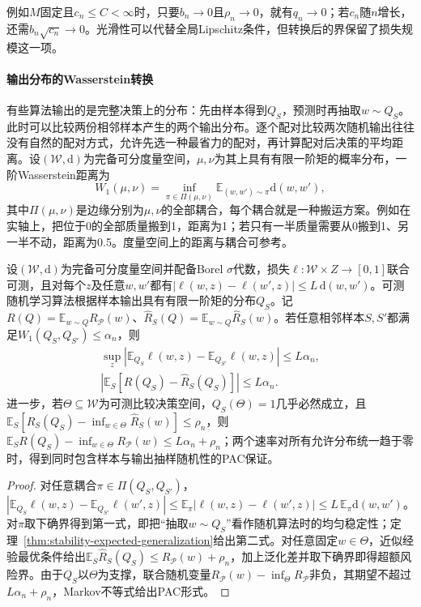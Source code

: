 例如$M$固定且$c_n\leq C<\infty$时，只要$b_n\to0$且$\rho_n\to0$，就有$q_n\to0$；若$c_n$随$n$增长，还需$b_n\sqrt{c_n}\to0$。光滑性可以代替全局Lipschitz条件，但转换后的界保留了损失规模这一项。

\paragraph{输出分布的Wasserstein转换}

有些算法输出的是完整决策上的分布：先由样本得到$Q_S$，预测时再抽取$w\sim Q_S$。此时可以比较两份相邻样本产生的两个输出分布。逐个配对比较两次随机输出往往没有自然的配对方式，允许先选一种最省力的配对，再计算配对后决策的平均距离。设$(\mathcal W,\mathrm d)$为完备可分度量空间，$\mu,\nu$为其上具有有限一阶矩的概率分布，一阶Wasserstein距离为
\[
 W_1(\mu,\nu)=\inf_{\pi\in\Pi(\mu,\nu)}\mathbb E_{(w,w')\sim\pi}\mathrm d(w,w'),
\]
其中$\Pi(\mu,\nu)$是边缘分别为$\mu,\nu$的全部耦合，每个耦合就是一种搬运方案。例如在实轴上，把位于0的全部质量搬到1，距离为1；若只有一半质量需要从0搬到1、另一半不动，距离为0.5。度量空间上的距离与耦合可参考。

\begin{theorem}[输出分布稳定性与期望泛化差]
\label{thm:distribution-stability-generalization}
设$(\mathcal W,\mathrm d)$为完备可分度量空间并配备Borel $\sigma$代数，损失$\ell:\mathcal W\times Z\to[0,1]$联合可测，且对每个$z$及任意$w,w'$都有$|\ell(w,z)-\ell(w',z)|\leq L\,\mathrm d(w,w')$。可测随机学习算法根据样本输出具有有限一阶矩的分布$Q_S$。记$R(Q)=\mathbb E_{w\sim Q}R_{\mathcal P}(w)$、$\hat R_S(Q)=\mathbb E_{w\sim Q}\hat R_S(w)$。若任意相邻样本$S,S'$都满足$W_1(Q_S,Q_{S'})\leq\alpha_n$，则
\[
\begin{gathered}
 \sup_z\left|\mathbb E_{Q_S}\ell(w,z)-\mathbb E_{Q_{S'}}\ell(w,z)\right|\leq L\alpha_n,\\
 \left|\mathbb E_S[R(Q_S)-\hat R_S(Q_S)]\right|\leq L\alpha_n.
\end{gathered}
\]
进一步，若$\Theta\subseteq\mathcal W$为可测比较决策空间，$Q_S(\Theta)=1$几乎必然成立，且$\mathbb E_S[\hat R_S(Q_S)-\inf_{w\in\Theta}\hat R_S(w)]\leq\rho_n$，则$\mathbb E_SR(Q_S)-\inf_{w\in\Theta}R_{\mathcal P}(w)\leq L\alpha_n+\rho_n$；两个速率对所有允许分布统一趋于零时，得到同时包含样本与输出抽样随机性的PAC保证。
\end{theorem}
\begin{proof}
对任意耦合$\pi\in\Pi(Q_S,Q_{S'})$，$|\mathbb E_{Q_S}\ell(w,z)-\mathbb E_{Q_{S'}}\ell(w',z)|\leq\mathbb E_\pi|\ell(w,z)-\ell(w',z)|\leq L\,\mathbb E_\pi\mathrm d(w,w')$。对$\pi$取下确界得到第一式，即把“抽取$w\sim Q_S$”看作随机算法时的均匀稳定性；定理~\ref{thm:stability-expected-generalization}给出第二式。对任意固定$w\in\Theta$，近似经验最优条件给出$\mathbb E_S\hat R_S(Q_S)\leq R_{\mathcal P}(w)+\rho_n$，加上泛化差并取下确界即得超额风险界。由于$Q_S$以$\Theta$为支撑，联合随机变量$R_{\mathcal P}(w)-\inf_\Theta R_{\mathcal P}$非负，其期望不超过$L\alpha_n+\rho_n$，Markov不等式给出PAC形式。
\end{proof}

